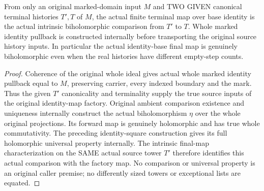 \begin{theorem}
\label{hir:smooth-original-terminal-identity-independent-history}
\leanok
{}
From only an original marked-domain input $M$ and TWO GIVEN canonical
terminal histories $T',T$ of $M$, the actual finite terminal map over
base identity is the actual intrinsic biholomorphic comparison from
$T'$ to $T$. Whole marked identity pullback is constructed internally
before transporting the original source history inputs. In particular
the actual identity-base final map is genuinely biholomorphic even
when the real histories have different empty-step counts.
\end{theorem}
\begin{proof}
Coherence of the original whole ideal gives actual whole marked
identity pullback equal to $M$, preserving carrier, every indexed
boundary and the mark. Thus the given $T'$ canonicality and terminality
supply the true source inputs of the original identity-map factory.
Original ambient comparison existence and uniqueness internally
construct the actual biholomorphism $\eta$ over the whole original
projections. Its forward map is genuinely holomorphic and has true
whole commutativity. The preceding identity-square construction gives
its full holomorphic universal property internally. The intrinsic
final-map characterization on the SAME actual source tower $T'$
therefore identifies this actual comparison with the factory map.
No comparison or universal property is an original caller premise;
no differently sized towers or exceptional lists are equated.
\end{proof}

